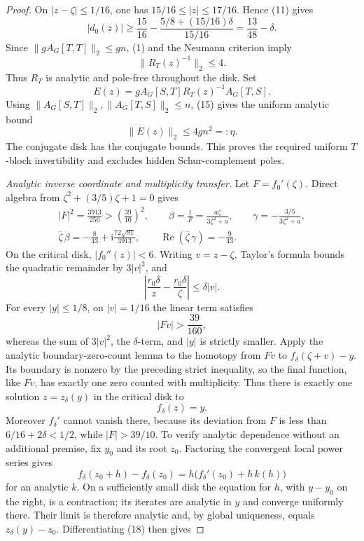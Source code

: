 \documentclass{article}
\begin{document}
\begin{proof}
On \(|z-\zeta|\leq1/16\), one has \(15/16\leq|z|\leq17/16\). Hence (11) gives
\[
 |d_0(z)|
 \geq \frac{15}{16}
  -\frac{5/8+(15/16)\delta}{15/16}
 =\frac{13}{48}-\delta.
\]
Since \(\|gA_G[T,T]\|_2\leq gn\), (1) and the Neumann criterion imply
\[
 \|R_T(z)^{-1}\|_2\leq4.
\tag{15}
\]
Thus \(R_T\) is analytic and pole-free throughout the disk. Set
\[
 E(z)=gA_G[S,T]R_T(z)^{-1}A_G[T,S].
\]
Using \(\|A_G[S,T]\|_2,\|A_G[T,S]\|_2\leq n\), (15) gives the uniform analytic bound
\[
 \|E(z)\|_2\leq4gn^2=:\eta.
\tag{16}
\]
The conjugate disk has the conjugate bounds. This proves the required uniform \(T\)-block invertibility and excludes hidden Schur-complement poles.

\emph{Analytic inverse coordinate and multiplicity transfer.}
Let \(F=f_0'(\zeta)\). Direct algebra from \(\zeta^2+(3/5)\zeta+1=0\) gives
\[
\begin{gathered}
 |F|^2=\frac{3913}{256}>\left(\frac{39}{10}\right)^2,\qquad
 \beta=\frac1F=\frac{a\zeta}{3\zeta^2+a},\qquad
 \gamma=-\frac{3/5}{3\zeta^2+a},\\
 \overline\zeta\,\beta
 =-\frac8{43}+\mathrm i\frac{72\sqrt{91}}{3913},
 \qquad
 \operatorname{Re}(\overline\zeta\,\gamma)=-\frac9{43}.
\end{gathered}
\tag{17}
\]
On the critical disk, \(|f_0''(z)|<6\). Writing \(v=z-\zeta\), Taylor's formula bounds the quadratic remainder by \(3|v|^2\), and
\[
 \left|\frac{r_0\delta}{z}-\frac{r_0\delta}{\zeta}\right|
 \leq\delta|v|.
\]
For every \(|y|\leq1/8\), on \(|v|=1/16\) the linear term satisfies
\[
 |Fv|>\frac{39}{160},
\]
whereas the sum of \(3|v|^2\), the \(\delta\)-term, and \(|y|\) is strictly smaller. Apply the analytic boundary-zero-count lemma to the homotopy from \(Fv\) to \(f_\delta(\zeta+v)-y\). Its boundary is nonzero by the preceding strict inequality, so the final function, like \(Fv\), has exactly one zero counted with multiplicity. Thus there is exactly one solution \(z=z_\delta(y)\) in the critical disk to
\[
 f_\delta(z)=y.
\tag{18}
\]
Moreover \(f_\delta'\) cannot vanish there, because its deviation from \(F\) is less than \(6/16+2\delta<1/2\), while \(|F|>39/10\). To verify analytic dependence without an additional premise, fix \(y_0\) and its root \(z_0\). Factoring the convergent local power series gives
\[
 f_\delta(z_0+h)-f_\delta(z_0)
 =h\bigl(f_\delta'(z_0)+h\,k(h)\bigr)
\]
for an analytic \(k\). On a sufficiently small disk the equation for \(h\), with \(y-y_0\) on the right, is a contraction; its iterates are analytic in \(y\) and converge uniformly there. Their limit is therefore analytic and, by global uniqueness, equals \(z_\delta(y)-z_0\). Differentiating (18) then gives

\end{proof}
\end{document}

